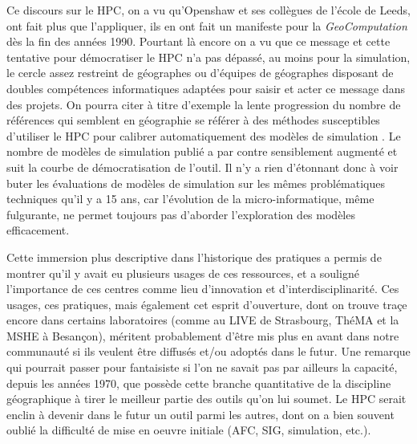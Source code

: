 Ce discours sur le HPC, on a vu qu'Openshaw et ses collègues de l'école de Leeds, ont fait plus que l'appliquer, ils en ont fait un manifeste pour la \textit{GeoComputation} \autocite{Openshaw2000b} dès la fin des années 1990. Pourtant là encore on a vu que ce message et cette tentative pour démocratiser le HPC n'a pas dépassé, au moins pour la simulation, le cercle assez restreint de géographes ou d'équipes de géographes disposant de doubles compétences informatiques adaptées pour saisir et acter ce message dans des projets. On pourra citer à titre d'exemple la lente progression du nombre de références qui semblent en géographie se référer à des méthodes susceptibles d'utiliser le HPC pour calibrer automatiquement des modèles de simulation \autocites{Diplock1996, Ngo2012, Straatman2004, Heppenstall2007, Schmitt2015, Wu1998, Wu2002, Li2001, Ahmadi2009}. Le nombre de modèles de simulation publié a par contre sensiblement augmenté et suit la courbe de démocratisation de l'outil. Il n'y a rien d'étonnant donc à voir buter les évaluations de modèles de simulation sur les mêmes problématiques techniques qu'il y a 15 ans, car l'évolution de la micro-informatique, même fulgurante, ne permet toujours pas d'aborder l'exploration des modèles efficacement.


Cette immersion plus descriptive dans l'historique des pratiques a permis de montrer qu'il y avait eu plusieurs usages de ces ressources, et a souligné l'importance de ces centres comme lieu d'innovation et d'interdisciplinarité. Ces usages, ces pratiques, mais également cet esprit d'ouverture, dont on trouve traçe encore dans certains laboratoires (comme au LIVE de Strasbourg, ThéMA et la MSHE à Besançon), méritent probablement d'être mis plus en avant dans notre communauté si ils veulent être diffusés et/ou adoptés dans le futur. Une remarque qui pourrait passer pour fantaisiste si l'on ne savait pas par ailleurs la capacité, depuis les années 1970, que possède cette branche quantitative de la discipline géographique à tirer le meilleur partie des outils qu'on lui soumet. Le HPC serait enclin à devenir dans le futur un outil parmi les autres, dont on a bien souvent oublié la difficulté de mise en oeuvre initiale (AFC, SIG, simulation, etc.).

